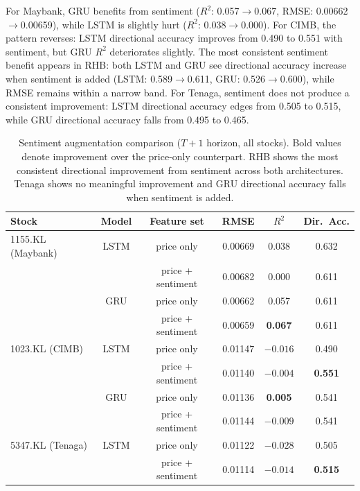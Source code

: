 \documentclass[12pt]{ucetd}
\begin{document}
For Maybank, GRU benefits from sentiment ($R^2$: 0.057$\to$0.067, RMSE: 0.00662$\to$0.00659), while LSTM is slightly hurt ($R^2$: 0.038$\to$0.000). For CIMB, the pattern reverses: LSTM directional accuracy improves from 0.490 to 0.551 with sentiment, but GRU $R^2$ deteriorates slightly. The most consistent sentiment benefit appears in RHB: both LSTM and GRU see directional accuracy increase when sentiment is added (LSTM: 0.589$\to$0.611, GRU: 0.526$\to$0.600), while RMSE remains within a narrow band. For Tenaga, sentiment does not produce a consistent improvement: LSTM directional accuracy edges from 0.505 to 0.515, while GRU directional accuracy falls from 0.495 to 0.465.

\begin{table}[H]
\caption{Sentiment augmentation comparison ($T{+}1$ horizon, all stocks). Bold values denote improvement over the price-only counterpart. RHB shows the most consistent directional improvement from sentiment across both architectures. Tenaga shows no meaningful improvement and GRU directional accuracy falls when sentiment is added.}
\label{tab:experiment3-sentiment}
\centering
\small
\begin{tabular}{|l|c|c|c|c|c|}
\hline
\textbf{Stock} & \textbf{Model} & \textbf{Feature set} & \textbf{RMSE} & \textbf{$R^2$} & \textbf{Dir.\ Acc.} \\
\hline
1155.KL (Maybank) & LSTM & price only         & 0.00669 & 0.038 & 0.632 \\
                   &      & price + sentiment   & 0.00682 & 0.000 & 0.611 \\
                   & GRU  & price only         & 0.00662 & 0.057 & 0.611 \\
                   &      & price + sentiment   & 0.00659 & \textbf{0.067} & 0.611 \\
\hline
1023.KL (CIMB)    & LSTM & price only         & 0.01147 & $-0.016$ & 0.490 \\
                   &      & price + sentiment   & 0.01140 & $-0.004$ & \textbf{0.551} \\
                   & GRU  & price only         & 0.01136 & \textbf{0.005} & 0.541 \\
                   &      & price + sentiment   & 0.01144 & $-0.009$ & 0.541 \\
\hline
5347.KL (Tenaga)  & LSTM & price only         & 0.01122 & $-0.028$ & 0.505 \\
                   &      & price + sentiment   & 0.01114 & \textbf{$-0.014$} & \textbf{0.515} \\

\end{tabular}
\end{table}
\end{document}
